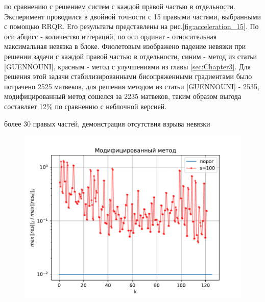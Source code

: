 по сравнению с решением систем с каждой правой частью в отдельности. Эксперимент проводился в двойной точности с 15 правыми частями,
выбранными с помощью RRQR. Его результаты представлены на рис.\ref{fig:acceleration_15}. По оси абцисс - количество иттераций, по оси
ординат - относительная максимальная невязка в блоке. Фиолетовым изображено падение невязки при решении задачи с каждой правой частью 
в отдельности, синим - метод из статьи [GUENNOUNI], красным - метод с улучшениями из главы \ref{sec:Chapter3}. Для решения этой задачи
стабилизированными бисопряженными градиентами было потрачено 2525 матвеков, для решения методом из статьи [GUENNOUNI] - 2535, модифицированный
метод сошелся за 2235 матвеков, таким образом выгода составляет 12\% по сравнению с неблочной версией.
\par более 30 правых частей, демонстрация отсутствия взрыва невязки
\begin{figure}[H]
    \centering
    \includegraphics[width=0.7\linewidth]{images/100_rhs.pdf}
    \caption{}
    \label{fig:100_rhs}
\end{figure}

\newpage
